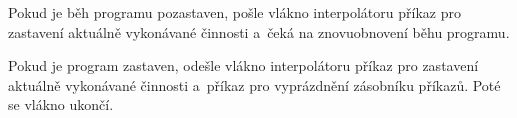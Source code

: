 		Pokud je běh programu pozastaven, pošle vlákno interpolátoru příkaz pro zastavení aktuálně vykonávané činnosti a~čeká na znovuobnovení běhu programu.
		
		Pokud je program zastaven, odešle vlákno interpolátoru příkaz pro zastavení aktuálně vykonávané činnosti a~příkaz pro vyprázdnění zásobníku příkazů. Poté se vlákno ukončí.